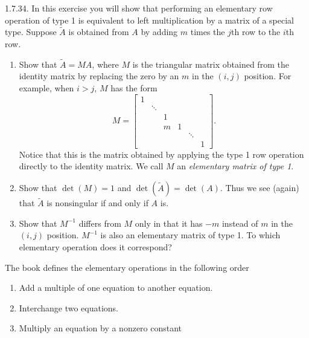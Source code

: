 \documentclass{report}
\begin{document}
    \bigbreak \noindent 
    \begin{mdframed}
        1.7.34.  In this exercise you will show that performing an elementary row operation of type 1 is equivalent to left multiplication by a matrix of a special type. Suppose $\tilde{A}$ is obtained from $A$ by adding $m$ times the $j$th row to the $i$th row.

        \begin{enumerate}[label=(\alph*)]
            \item Show that $\tilde{A} = M A$, where $M$ is the triangular matrix obtained 
                from the identity matrix by replacing the zero by an $m$ in the $(i,j)$ position. 
                For example, when $i > j$, $M$ has the form
                \[
                    M = \begin{bmatrix}
                        1 &        &        &        &  & \\
                          & \ddots &        &        &  & \\
                          &        & 1      &        &  & \\
                          &        & m      & 1      &  & \\
                          &        &        &        & \ddots& \\
                          &        &        &        &       & 1
                    \end{bmatrix}.
                \]
                Notice that this is the matrix obtained by applying the type 1 row operation 
                directly to the identity matrix. We call $M$ an \textit{elementary matrix of type 1}.

            \item Show that $\det(M) = 1$ and $\det(\tilde{A}) = \det(A)$. 
                Thus we see (again) that $\tilde{A}$ is nonsingular if and only if $A$ is.

            \item Show that $M^{-1}$ differs from $M$ only in that it has $-m$ instead of $m$ 
                in the $(i,j)$ position. $M^{-1}$ is also an elementary matrix of type 1. 
                To which elementary operation does it correspond?
        \end{enumerate}
    \end{mdframed}
    \bigbreak \noindent 
    \begin{remark}
       The book defines the elementary operations in the following order 
       \begin{enumerate}
           \item Add a multiple of one equation to another equation.
           \item Interchange two equations.
           \item Multiply an equation by a nonzero constant
       \end{enumerate}
    \end{remark}
\end{document}
